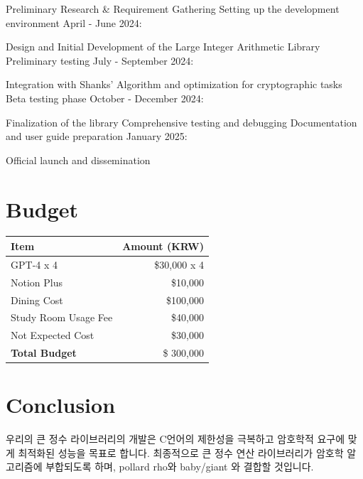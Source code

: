 \documentclass[12pt,a4paper]{article}
\begin{document}
	Preliminary Research \& Requirement Gathering
	Setting up the development environment
	April - June 2024:
	
	Design and Initial Development of the Large Integer Arithmetic Library
	Preliminary testing
	July - September 2024:
	
	Integration with Shanks' Algorithm and optimization for cryptographic tasks
	Beta testing phase
	October - December 2024:
	
	Finalization of the library
	Comprehensive testing and debugging
	Documentation and user guide preparation
	January 2025:
	
	Official launch and dissemination
	
	\section{Budget}
	
	\begin{center}
		\begin{tabularx}{\textwidth}{X r}
			\toprule
			\textbf{Item} & \textbf{Amount (KRW)} \\
			\midrule
			GPT-4 x 4 & \$30,000 x 4 \\
			Notion Plus & \$10,000 \\
			Dining Cost & \$100,000 \\
			Study Room Usage Fee & \$40,000 \\
			Not Expected Cost & \$30,000 \\
			\midrule
			\textbf{Total Budget} & \$ 300,000 \\
			\bottomrule
		\end{tabularx}
	\end{center}

	\newpage
	\section{Conclusion}
	우리의 큰 정수 라이브러리의 개발은 C언어의 제한성을 극복하고 암호학적 요구에 맞게 최적화된 성능을 목표로 합니다. 최종적으로 큰 정수 연산 라이브러리가 암호학 알고리즘에 부합되도록 하며, pollard rho와 baby/giant 와 결합할 것입니다.
	
\end{document}
